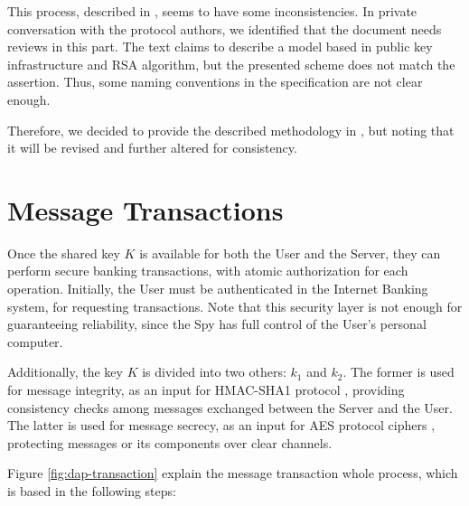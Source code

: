 This process, described in \cite[p.78]{bbcode-thesis}, seems to have some inconsistencies. In private conversation with the protocol authors, we identified that the document needs reviews in this part. The text claims to describe a model based in public key infrastructure and RSA algorithm, but the presented scheme does not match the assertion. Thus, some naming conventions in the specification are not clear enough.

Therefore, we decided to provide the described methodology in \cite{bbcode-thesis}, but noting that it will be revised and further altered for consistency.




















\section{Message Transactions}
Once the shared key $K$ is available for both the User and the Server, they can perform secure banking transactions, with atomic authorization for each operation. Initially, the User must be authenticated in the Internet Banking system, for requesting transactions. Note that this security layer is not enough for guaranteeing reliability, since the Spy has full control of the User's personal computer.

Additionally, the key $K$ is divided into two others: $k_1$ and $k_2$. The former is used for message integrity, as an input for HMAC-SHA1 protocol \cite{bellare-hmac}, providing consistency checks among messages exchanged between the Server and the User. The latter is used for message secrecy, as an input for AES protocol ciphers \cite{AES}, protecting messages or its components over clear channels.

Figure \ref{fig:dap-transaction} explain the message transaction whole process, which is based in the following steps:


